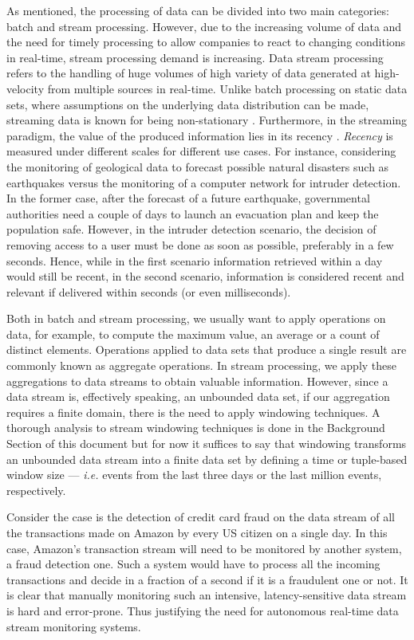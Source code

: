 As mentioned, the processing of data can be divided into two main categories: batch and stream processing. However, due to the increasing volume of data and the need for timely processing to allow companies to react to changing conditions in real-time, stream processing demand is increasing. Data stream processing refers to the handling of huge volumes of high variety of data generated at high-velocity from multiple sources in real-time. Unlike batch processing on static data sets, where assumptions on the underlying data distribution can be made, streaming data is known for being non-stationary \cite{Gama-Knowledge-Discovery}. Furthermore, in the streaming paradigm, the value of the produced information lies in its recency \cite{Kolajo-Big-data-stream-SLR}. \textit{Recency} is measured under different scales for different use cases. For instance, considering the monitoring of geological data to forecast possible natural disasters such as earthquakes versus the monitoring of a computer network for intruder detection. In the former case, after the forecast of a future earthquake, governmental authorities need a couple of days to launch an evacuation plan and keep the population safe. However, in the intruder detection scenario, the decision of removing access to a user must be done as soon as possible, preferably in a few seconds. Hence, while in the first scenario information retrieved within a day would still be recent, in the second scenario, information is considered recent and relevant if delivered within seconds (or even milliseconds).

Both in batch and stream processing, we usually want to apply operations on data, for example, to compute the maximum value, an average or a count of distinct elements. Operations applied to data sets that produce a single result are commonly known as aggregate operations. In stream processing, we apply these aggregations to data streams to obtain valuable information. However, since a data stream is, effectively speaking, an unbounded data set, if our aggregation requires a finite domain, there is the need to apply windowing techniques. A thorough analysis to stream windowing techniques is done in the Background Section of this document but for now it suffices to say that windowing transforms an unbounded data stream into a finite data set by defining a time or tuple-based window size --- \textit{i.e.} events from the last three days or the last million events, respectively.

Consider the case is the detection of credit card fraud on the data stream of all the transactions made on Amazon by every US citizen on a single day. In this case, Amazon's transaction stream will need to be monitored by another system, a fraud detection one. Such a system would have to process all the incoming transactions and decide in a fraction of a second if it is a fraudulent one or not. It is clear that manually monitoring such an intensive, latency-sensitive data stream is hard and error-prone. Thus justifying the need for autonomous real-time data stream monitoring systems.

